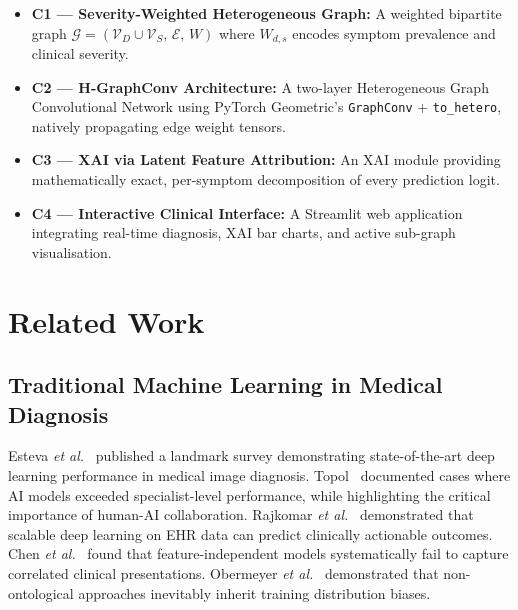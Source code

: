 \documentclass[conference]{IEEEtran}
\begin{document}
\begin{itemize}
  \item \textbf{C1 --- Severity-Weighted Heterogeneous Graph:} A
        weighted bipartite graph $\mathcal{G}= (\mathcal{V}_D \cup
        \mathcal{V}_S,\,\mathcal{E},\,W)$ where $W_{d,s}$ encodes
        symptom prevalence and clinical severity.
  \item \textbf{C2 --- H-GraphConv Architecture:} A two-layer
        Heterogeneous Graph Convolutional Network using PyTorch
        Geometric's \texttt{GraphConv} + \texttt{to\_hetero},
        natively propagating edge weight tensors.
  \item \textbf{C3 --- XAI via Latent Feature Attribution:} An XAI
        module providing mathematically exact, per-symptom
        decomposition of every prediction logit.
  \item \textbf{C4 --- Interactive Clinical Interface:} A Streamlit
        web application integrating real-time diagnosis, XAI bar
        charts, and active sub-graph visualisation.
\end{itemize}

\section{Related Work}
\label{sec:related}

\subsection{Traditional Machine Learning in Medical Diagnosis}

Esteva \textit{et al.}~\cite{esteva2021deep} published a landmark
survey demonstrating state-of-the-art deep learning performance in
medical image diagnosis. Topol~\cite{topol2019high} documented cases
where AI models exceeded specialist-level performance, while
highlighting the critical importance of human-AI collaboration.
Rajkomar \textit{et al.}~\cite{rajkomar2018deep} demonstrated that
scalable deep learning on EHR data can predict clinically actionable
outcomes. Chen \textit{et al.}~\cite{chen2018why} found that
feature-independent models systematically fail to capture correlated
clinical presentations. Obermeyer \textit{et
al.}~\cite{obermeyer2019dissecting} demonstrated that non-ontological
approaches inevitably inherit training distribution biases.
\end{document}

